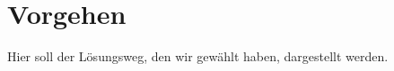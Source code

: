 \chapter{Vorgehen} \label{vorgehen}

\nocite{*}


Hier soll der Lösungsweg, den wir gewählt haben, dargestellt werden.